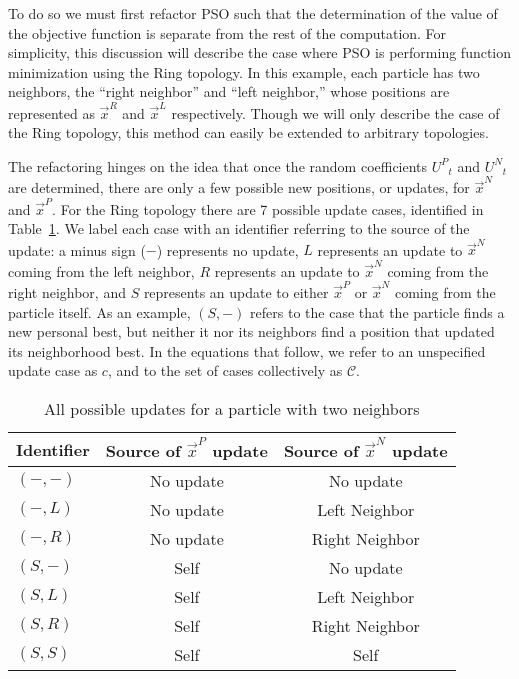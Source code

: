 \documentclass[smallcondensed]{svjour3}
\providecommand{\pers}{\ensuremath{P}}
\providecommand{\neigh}{\ensuremath{N}}
\providecommand{\leftind}{\ensuremath{L}}
\providecommand{\rightind}{\ensuremath{R}}
\providecommand{\nURand}{\ensuremath{U^\neigh}}
\providecommand{\pURand}{\ensuremath{U^\pers}}
\providecommand{\nbest}{\ensuremath{\Vec{x}^\neigh}}
\providecommand{\pbest}{\ensuremath{\Vec{x}^\pers}}
\providecommand{\leftn}{\ensuremath{\Vec{x}^\leftind}}
\providecommand{\rightn}{\ensuremath{\Vec{x}^\rightind}}
\providecommand{\caseset}{\ensuremath{\mathcal{C}}}
\providecommand{\casegen}{\ensuremath{c}}
\providecommand{\casexn}{\ensuremath{(S,-)}}
\providecommand{\casexx}{\ensuremath{(S,S)}}
\providecommand{\casexl}{\ensuremath{(S,\leftind)}}
\providecommand{\casexr}{\ensuremath{(S,\rightind)}}
\providecommand{\casepn}{\ensuremath{(-,-)}}
\providecommand{\casepl}{\ensuremath{(-,\leftind)}}
\providecommand{\casepr}{\ensuremath{(-,\rightind)}}
\begin{document}
To do so we must first refactor PSO such that the determination of the value
of the objective function is separate from the rest of the computation.  For
simplicity, this discussion will describe the case where PSO is performing
function minimization using the Ring topology.  In this example, each particle
has two neighbors, the ``right neighbor'' and ``left neighbor,'' whose
positions are represented as $\rightn$ and $\leftn$ respectively.  Though we
will only describe the case of the Ring topology, this method can easily be
extended to arbitrary topologies.

The refactoring hinges on the idea that once the random coefficients
$\pURand_{t}$ and $\nURand_{t}$ are determined, there are only a few possible
new positions, or updates, for $\nbest$ and $\pbest$.  For the Ring topology
there are 7 possible update cases, identified in Table~\ref{tab:evals}.  We
label each case with an identifier referring to the source of the update: a
minus sign ($-$) represents no update, $L$ represents an update to $\nbest$
coming from the left neighbor, $R$ represents an update to $\nbest$ coming from
the right neighbor, and $S$ represents an update to either $\pbest$ or $\nbest$
coming from the particle itself.  As an example, $\casexn$ refers to the case
that the particle finds a new personal best, but neither it nor its neighbors
find a position that updated its neighborhood best.  In the equations that
follow, we refer to an unspecified update case as $\casegen$, and to the set of
cases collectively as $\caseset$.

\begin{table}
  \caption{All possible updates for a particle with two neighbors}
  \label{tab:evals}
  \centering
  \begin{tabular}{lcc}
	Identifier&Source of $\pbest$ update&Source of $\nbest$ update\\
	\hline
	\hline
	$\casepn$&No update&No update\\
	\hline
	$\casepl$&No update&Left Neighbor\\
	\hline
	$\casepr$&No update&Right Neighbor\\
	\hline
	$\casexn$&Self&No update\\
	\hline
	$\casexl$&Self&Left Neighbor\\
	\hline
	$\casexr$&Self&Right Neighbor\\
	\hline
	$\casexx$&Self&Self\\
	\hline
  \end{tabular}
\end{table}
\end{document}
